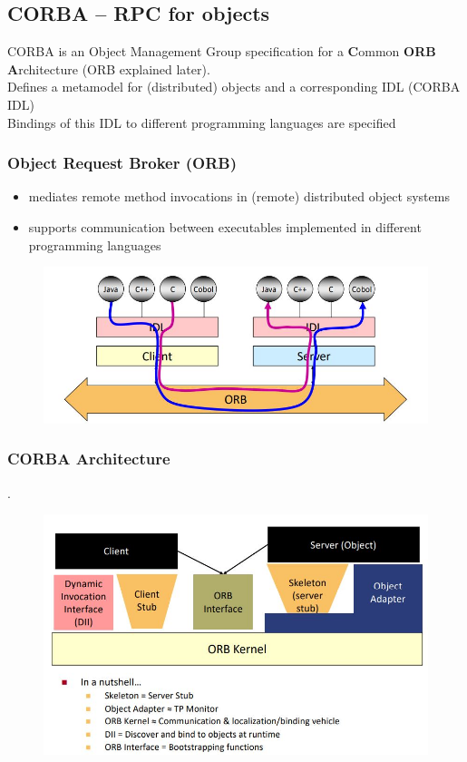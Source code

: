 		\subsection{CORBA -- RPC for objects}
			CORBA is an Object Management Group specification for a	\textbf{C}ommon \textbf{ORB} \textbf{A}rchitecture (ORB explained later).\\
			Defines a metamodel for (distributed) objects and a corresponding IDL (CORBA IDL)\\
			Bindings of this IDL to different programming languages are	specified
			
			\subsubsection{Object Request Broker (ORB)}
			\begin{itemize}
				\item mediates remote method invocations in (remote) distributed object systems
				\item supports communication between executables implemented in different programming languages
			\end{itemize}
			\begin{figure}[h!]
				\includegraphics[scale=0.7]{res/orb.jpg}
			\end{figure}
			\pagebreak
			\subsubsection{CORBA Architecture}.
				\begin{figure}[h!]
					\includegraphics[scale=0.6]{res/corba-arch.jpg}
				\end{figure}
			
